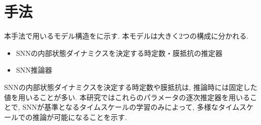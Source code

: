 \section{手法}

本手法で用いるモデル構造をに示す.
本モデルは大きく2つの構成に分かれる.
\begin{itemize}
    \item SNNの内部状態ダイナミクスを決定する時定数・膜抵抗の推定器
    \item SNN推論器
\end{itemize}
SNNの内部状態ダイナミクスを決定する時定数や膜抵抗は, 推論時には固定した値を用いることが多い\cite{fang2021incorporating}\cite{zheng2024temporal}.
本研究ではこれらのパラメータの逐次推定器を用いることで, SNNが基準となるタイムスケールの学習のみによって, 多様なタイムスケールでの推論が可能になることを示す.



